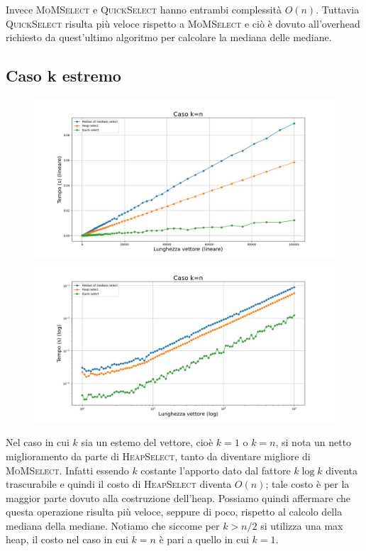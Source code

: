 \documentclass[a4paper]{article}
\newcommand{\QuickSelect}{\textsc{QuickSelect}}
\newcommand{\HeapSelect}{\textsc{HeapSelect}}
\newcommand{\MoMSelect}{\textsc{MoMSelect}}
\begin{document}
Invece \MoMSelect{} e \QuickSelect{} hanno entrambi complessità $O(n)$.
Tuttavia \QuickSelect{} risulta più veloce rispetto a \MoMSelect{} e ciò è dovuto all'overhead richiesto da quest'ultimo algoritmo per calcolare la mediana delle mediane.

\newpage
\subsection{Caso k estremo}
\begin{figure}[h]
            \centering
            \includegraphics[width=.83\textwidth]{graphs/k_last_n.png}
            \includegraphics[width=.83\textwidth]{graphs/k_last_2xlog.png}
\end{figure}
Nel caso in cui $k$ sia un estemo del vettore, cioè $k=1$ o $k=n$, si nota un netto miglioramento da parte di \HeapSelect{}, tanto da diventare migliore di \MoMSelect{}.
Infatti essendo $k$ costante l'apporto dato dal fattore $k\log k$ diventa trascurabile e quindi il costo di \HeapSelect{} diventa $O(n)$; tale costo è per la maggior parte dovuto alla costruzione dell'heap.
Possiamo quindi affermare che questa operazione risulta più veloce, seppure di poco, rispetto al calcolo della mediana della mediane.
Notiamo che siccome per $k > n/2$ si utilizza una max heap, il costo nel caso in cui $k=n$ è pari a quello in cui $k=1$.
\end{document}
